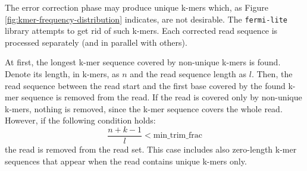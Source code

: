 The error correction phase may produce unique k-mers which, as Figure \ref{fig:kmer-frequency-distribution} indicates, are not desirable. The \texttt{fermi-lite} library attempts to get rid of such k-mers. Each corrected read sequence is processed separately (and in parallel with others). 

At first, the longest k-mer sequence covered by non-unique k-mers is found. Denote its length, in k-mers, as $n$ and the read sequence length as $l$. Then, the read sequence between the read start and the first base covered by the found k-mer sequence is removed from the read. If the read is covered only by non-unique k-mers, nothing is removed, since the k-mer sequence covers the whole read. However, if the following condition holds:
$$
\frac{n + k - 1}{l} < \text{min\_trim\_frac}
$$
the read is removed from the read set. This case includes also zero-length k-mer sequences that appear when the read contains unique k-mers only.